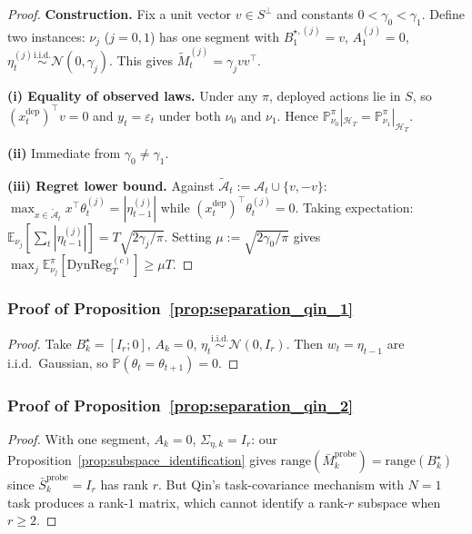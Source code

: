 \documentclass{article}
\newcommand{\E}{\mathbb{E}}
\newcommand{\Prob}{\mathbb{P}}
\newcommand{\cA}{\mathcal{A}}
\newcommand{\cH}{\mathcal{H}}
\newcommand{\DynReg}{\mathrm{DynReg}}
\newcommand{\range}{\mathrm{range}}
\begin{document}
\begin{proof}
\textbf{Construction.}
Fix a unit vector $v \in S^\perp$ and constants $0 < \gamma_0 < \gamma_1$.
Define two instances: $\nu_j$ ($j=0,1$) has one segment with $B_1^{\star,(j)} = v$, $A_1^{(j)} = 0$, $\eta_t^{(j)} \stackrel{\mathrm{i.i.d.}}{\sim} \mathcal{N}(0, \gamma_j)$.
This gives $\widetilde M_t^{(j)} = \gamma_j v v^\top$.

\textbf{(i) Equality of observed laws.}
Under any $\pi$, deployed actions lie in $S$, so $(x_t^{\mathrm{dep}})^\top v = 0$ and $y_t = \varepsilon_t$ under both $\nu_0$ and $\nu_1$.
Hence $\Prob_{\nu_0}^\pi|_{\cH_T} = \Prob_{\nu_1}^\pi|_{\cH_T}$.

\textbf{(ii)} Immediate from $\gamma_0 \neq \gamma_1$.

\textbf{(iii) Regret lower bound.}
Against $\widetilde{\cA}_t := \cA_t \cup \{v, -v\}$: $\max_{x \in \widetilde{\cA}_t} x^\top \theta_t^{(j)} = |\eta_{t-1}^{(j)}|$ while $(x_t^{\mathrm{dep}})^\top \theta_t^{(j)} = 0$.
Taking expectation: $\E_{\nu_j}[\sum_t |\eta_{t-1}^{(j)}|] = T\sqrt{2\gamma_j/\pi}$.
Setting $\mu := \sqrt{2\gamma_0/\pi}$ gives $\max_j \E_{\nu_j}^\pi[\DynReg_T^{(c)}] \ge \mu T$.
\end{proof}

\subsubsection{Proof of Proposition~\ref{prop:separation_qin_1}}
\label{proof:separation_qin_1}

\begin{proof}
Take $B_k^\star = [I_r; 0]$, $A_k = 0$, $\eta_t \stackrel{\mathrm{i.i.d.}}{\sim} \mathcal N(0,I_r)$.
Then $w_t = \eta_{t-1}$ are i.i.d.\ Gaussian, so $\Prob(\theta_t = \theta_{t+1}) = 0$.
\end{proof}

\subsubsection{Proof of Proposition~\ref{prop:separation_qin_2}}
\label{proof:separation_qin_2}

\begin{proof}
With one segment, $A_k = 0$, $\Sigma_{\eta,k} = I_r$: our Proposition~\ref{prop:subspace_identification} gives $\range(\bar M_k^{\mathrm{probe}}) = \range(B_k^\star)$ since $\bar S_k^{\mathrm{probe}} = I_r$ has rank $r$.
But Qin's task-covariance mechanism with $N=1$ task produces a rank-$1$ matrix, which cannot identify a rank-$r$ subspace when $r \ge 2$.
\end{proof}
\end{document}
